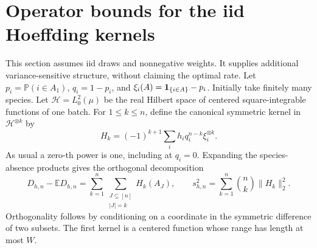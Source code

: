 \documentclass[11pt]{article}
\numberwithin{equation}{section}
\theoremstyle{remark}\newtheorem{remark}[theorem]{Remark}
\newcommand{\E}{\mathbb E}\newcommand{\Pp}{\mathbb P}
\begin{document}
\section{Operator bounds for the iid Hoeffding kernels}
\label{sec:hoeffding}
This section assumes iid draws and nonnegative weights. It supplies
additional variance-sensitive structure, without claiming the optimal rate.
Let $p_i=\Pp(i\in A_1)$, $q_i=1-p_i$, and
$\xi_i(A)=\mathbf1_{\{i\in A\}}-p_i$. Initially take finitely many species.
Let $\mathcal H=L_0^2(\mu)$ be the real Hilbert space of centered
square-integrable functions of one batch. For $1\le k\le n$, define the
canonical symmetric kernel in $\mathcal H^{\otimes k}$ by
\begin{equation}\label{eq:kernel}
 H_k=(-1)^{k+1}\sum_i h_iq_i^{n-k}\xi_i^{\otimes k}.
\end{equation}
As usual a zero-th power is one, including at $q_i=0$.
Expanding the species-absence products gives the orthogonal decomposition
\begin{equation}\label{eq:Hoeffding}
 D_{h,n}-\E D_{h,n}
 =\sum_{k=1}^n\sum_{\substack{J\subseteq[n]\\|J|=k}}H_k(A_J),
 \qquad
 s_{h,n}^2=\sum_{k=1}^n\binom nk\|H_k\|_2^2.
\end{equation}
Orthogonality follows by conditioning on a coordinate in the symmetric
difference of two subsets. The first kernel is a centered function whose
range has length at most $W$.
\end{document}
